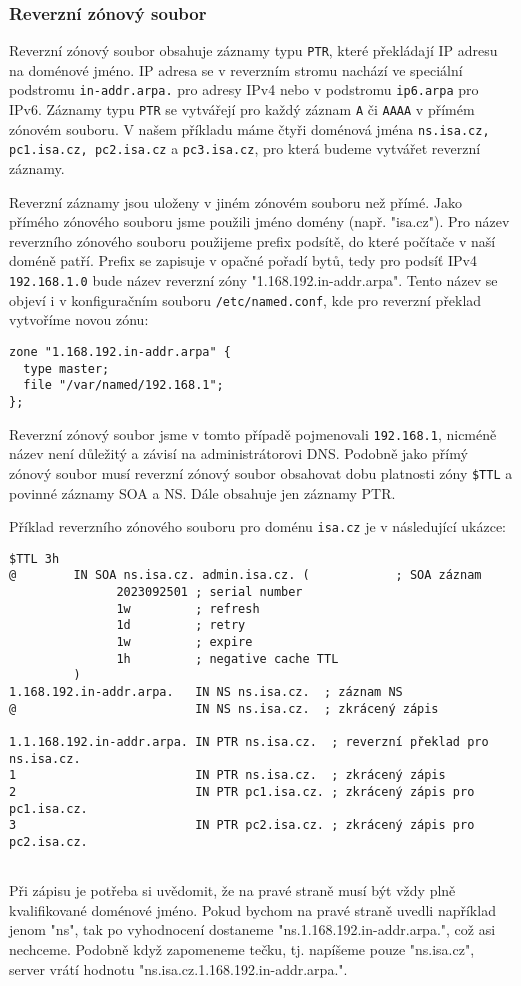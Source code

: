 \subsubsection{Reverzní zónový soubor}
Reverzní zónový soubor obsahuje záznamy typu {\tt PTR}, které překládají IP adresu na doménové jméno. IP adresa se v reverzním stromu nachází ve speciální podstromu {\tt in-addr.arpa.} pro adresy IPv4 nebo v podstromu {\tt ip6.arpa} pro IPv6. Záznamy typu {\tt PTR} se vytvářejí pro každý záznam {\tt A} či {\tt AAAA} v přímém zónovém souboru. V našem příkladu máme čtyři doménová jména {\tt ns.isa.cz, pc1.isa.cz, pc2.isa.cz} a {\tt pc3.isa.cz}, pro která budeme vytvářet reverzní záznamy. 

Reverzní záznamy jsou uloženy v jiném zónovém souboru než přímé. Jako přímého zónového souboru jsme použili jméno domény (např. "isa.cz"). Pro název reverzního zónového souboru použijeme prefix podsítě, do které počítače v naší doméně patří. Prefix se zapisuje v opačné pořadí bytů, tedy pro podsíť IPv4 {\tt 192.168.1.0} bude název reverzní zóny "1.168.192.in-addr.arpa". Tento název se objeví i v konfiguračním souboru {\tt /etc/named.conf}, kde pro reverzní překlad vytvoříme novou zónu:
\begin{verbatim}
zone "1.168.192.in-addr.arpa" {
  type master;
  file "/var/named/192.168.1";
};
\end{verbatim}        
Reverzní zónový soubor jsme v tomto případě pojmenovali {\tt 192.168.1}, nicméně název není důležitý a závisí na administrátorovi DNS. Podobně jako přímý zónový soubor musí reverzní zónový soubor obsahovat dobu platnosti zóny {\tt \$TTL} a povinné záznamy SOA a NS. Dále obsahuje jen záznamy PTR.

Příklad reverzního zónového souboru pro doménu {\tt isa.cz} je v následující ukázce:
\begin{verbatim}
$TTL 3h
@        IN SOA ns.isa.cz. admin.isa.cz. (            ; SOA záznam
               2023092501 ; serial number
               1w         ; refresh
               1d         ; retry 
               1w         ; expire
               1h         ; negative cache TTL
         )
1.168.192.in-addr.arpa.   IN NS ns.isa.cz.  ; záznam NS
@                         IN NS ns.isa.cz.  ; zkrácený zápis

1.1.168.192.in-addr.arpa. IN PTR ns.isa.cz.  ; reverzní překlad pro ns.isa.cz.
1                         IN PTR ns.isa.cz.  ; zkrácený zápis
2                         IN PTR pc1.isa.cz. ; zkrácený zápis pro pc1.isa.cz.
3                         IN PTR pc2.isa.cz. ; zkrácený zápis pro pc2.isa.cz.
                    
\end{verbatim}
Při zápisu je potřeba si uvědomit, že na pravé straně musí být vždy plně kvalifikované doménové jméno. Pokud bychom na pravé straně uvedli například jenom "ns", tak po vyhodnocení dostaneme "ns.1.168.192.in-addr.arpa.", což asi nechceme. Podobně když zapomeneme tečku, tj. napíšeme pouze "ns.isa.cz", server vrátí hodnotu "ns.isa.cz.1.168.192.in-addr.arpa.". 

